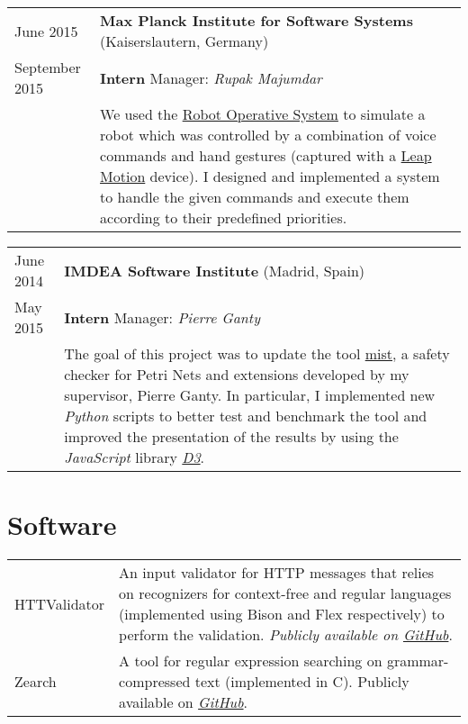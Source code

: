 \documentclass[a4paper,10pt]{article} %
\begin{document}
\begin{tabular}{p{2.5cm}p{13.2cm}}
{\small June 2015} & \textbf{Max Planck Institute for Software Systems} (Kaiserslautern, Germany) \\
{\small September 2015} & \textcolor{azureblue}{\textbf{Intern}} \hfill Manager: \emph{Rupak Majumdar} \\
& We used the \href{https://www.ros.org/}{Robot Operative System} to simulate a robot which was controlled by a combination of voice commands and hand gestures (captured with a \href{https://www.leapmotion.com/}{Leap Motion} device).
I designed and implemented a system to handle the given commands and execute them according to their predefined priorities.
\end{tabular}

\begin{tabular}{p{2.5cm}p{13.2cm}}
{\small June 2014} & \textbf{IMDEA Software Institute} (Madrid, Spain) \\
{\small May 2015} & \textcolor{azureblue}{\textbf{Intern}} \hfill Manager: \emph{Pierre Ganty}\\
& The goal of this project was to update the tool \href{https://github.com/pierreganty/mist/wiki}{mist}, a safety checker for Petri Nets and extensions developed by my supervisor, Pierre Ganty.
In particular, I implemented new \emph{Python} scripts to better test and benchmark the tool and improved the presentation of the results by using the \emph{JavaScript} library \href{https://d3js.org/}{\emph{D3}}.
\end{tabular}

\section{Software}

\begin{tabular}{p{2.5cm}p{13.2cm}}
{\small HTTValidator} & An input validator for HTTP messages that relies on recognizers for context-free and regular languages (implemented using Bison and Flex respectively) to perform the validation. \emph{Publicly available on \href{https://github.com/pevalme/HTTPValidator}{GitHub}}. \\

{\small Zearch} & A tool for regular expression searching on grammar-compressed text (implemented in C). Publicly available on \emph{\href{https://github.com/pevalme/zearch}{GitHub}}.\\
\end{tabular}
\end{document}
